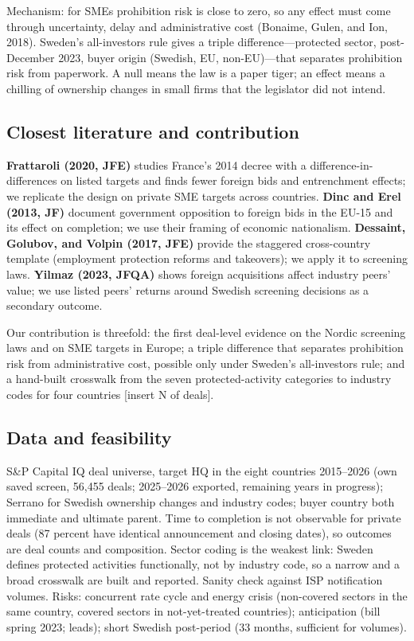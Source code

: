 \documentclass[12pt,a4paper]{article}
\begin{document}
Mechanism: for SMEs prohibition risk is close to zero, so any effect must come through uncertainty, delay and administrative cost (Bonaime, Gulen, and Ion, 2018). Sweden's all-investors rule gives a triple difference---protected sector, post-December 2023, buyer origin (Swedish, EU, non-EU)---that separates prohibition risk from paperwork. A null means the law is a paper tiger; an effect means a chilling of ownership changes in small firms that the legislator did not intend.

\subsection{Closest literature and contribution}

\textbf{Frattaroli (2020, JFE)} studies France's 2014 decree with a difference-in-differences on listed targets and finds fewer foreign bids and entrenchment effects; we replicate the design on private SME targets across countries. \textbf{Dinc and Erel (2013, JF)} document government opposition to foreign bids in the EU-15 and its effect on completion; we use their framing of economic nationalism. \textbf{Dessaint, Golubov, and Volpin (2017, JFE)} provide the staggered cross-country template (employment protection reforms and takeovers); we apply it to screening laws. \textbf{Yilmaz (2023, JFQA)} shows foreign acquisitions affect industry peers' value; we use listed peers' returns around Swedish screening decisions as a secondary outcome.

Our contribution is threefold: the first deal-level evidence on the Nordic screening laws and on SME targets in Europe; a triple difference that separates prohibition risk from administrative cost, possible only under Sweden's all-investors rule; and a hand-built crosswalk from the seven protected-activity categories to industry codes for four countries [insert N of deals].

\subsection{Data and feasibility}

S\&P Capital IQ deal universe, target HQ in the eight countries 2015--2026 (own saved screen, 56,455 deals; 2025--2026 exported, remaining years in progress); Serrano for Swedish ownership changes and industry codes; buyer country both immediate and ultimate parent. Time to completion is not observable for private deals (87 percent have identical announcement and closing dates), so outcomes are deal counts and composition. Sector coding is the weakest link: Sweden defines protected activities functionally, not by industry code, so a narrow and a broad crosswalk are built and reported. Sanity check against ISP notification volumes. Risks: concurrent rate cycle and energy crisis (non-covered sectors in the same country, covered sectors in not-yet-treated countries); anticipation (bill spring 2023; leads); short Swedish post-period (33 months, sufficient for volumes).
\end{document}
